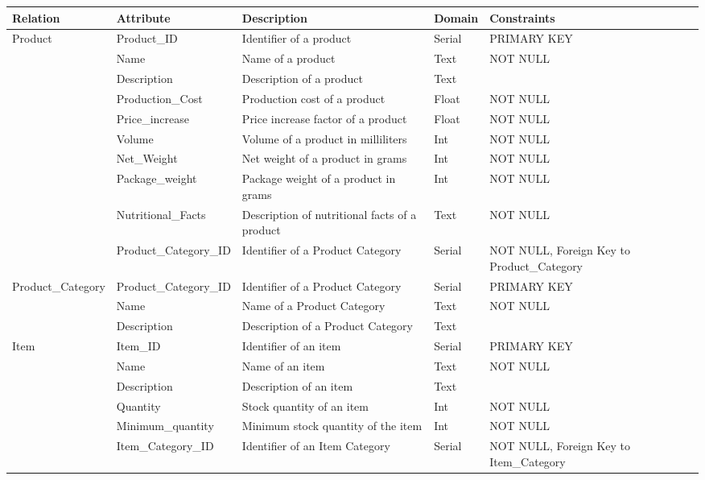 \begin{longtable}{|p{}|p{} |p{}|p{}|p{} |} 
\hline
\textbf{Relation} & \textbf{Attribute} & \textbf{Description} & \textbf{Domain} & \textbf{Constraints} \\\hline

\multirow{10}{*}{Product} & Product\_ID & Identifier of a product & Serial &  PRIMARY KEY\\\cline{2-5}
& Name & Name of a product & Text & NOT NULL \\\cline{2-5}
& Description & Description of a product  & Text &  \\\cline{2-5}
& Production\_Cost & Production cost of a product & Float & NOT NULL \\\cline{2-5}
& Price\_increase & Price increase factor of a product & Float & NOT NULL \\\cline{2-5}
& Volume & Volume of a product in milliliters  & Int & NOT NULL \\\cline{2-5}
& Net\_Weight & Net weight of a product in grams & Int & NOT NULL \\\cline{2-5}
& Package\_weight & Package weight of a product in grams & Int  & NOT NULL \\\cline{2-5}
& Nutritional\_Facts & Description of nutritional facts of a product & Text & NOT NULL \\\cline{2-5}
& Product\_Category\_ID & Identifier of a Product Category & Serial  & NOT NULL, Foreign Key to Product\_Category \\\hline

\multirow{3}{*}{Product\_Category} & Product\_Category\_ID & Identifier of a Product Category & Serial & PRIMARY KEY \\\cline{2-5}
& Name & Name of a Product Category & Text & NOT NULL \\\cline{2-5}
& Description & Description of a Product Category & Text & \\\hline

\multirow{5}{*}{Item} & Item\_ID & Identifier of an item  & Serial & PRIMARY KEY \\\cline{2-5}
& Name & Name of an item & Text & NOT NULL\\\cline{2-5}
& Description & Description of an item & Text & \\\cline{2-5}
& Quantity & Stock quantity of an item & Int & NOT NULL \\\cline{2-5}
& Minimum\_quantity & Minimum stock quantity of the item & Int & NOT NULL \\\cline{2-5}
& Item\_Category\_ID & Identifier of an Item Category & Serial  & NOT NULL, Foreign Key to Item\_Category\\\hline


\end{longtable}
